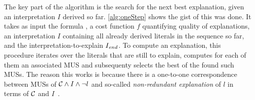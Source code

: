 The key part of the algorithm is the search for the next best explanation, given an interpretation $I$ derived so far. 
\cref{alg:oneStep} shows the gist of this was done.
It takes as input the formula \formulac, a cost function $f$ quantifying quality of explanations, an interpretation $I$ containing all already derived literals in the sequence so far, and the interpretation-to-explain $I_\mathit{end} $. 
To compute an explanation, this procedure iterates over the literals that are still to explain, computes for each of them an associated MUS and subsequenty selects the best of the found such MUSs.  
The reason this works is because there is a one-to-one correspondence between MUSs of $\mathcal{C}  \land I \land \neg l$ and so-called \emph{non-redundant explanation} of $l$ in terms of $\mathcal{C} $ and $I$~\cite{ecai/BogaertsGCG20}. 

